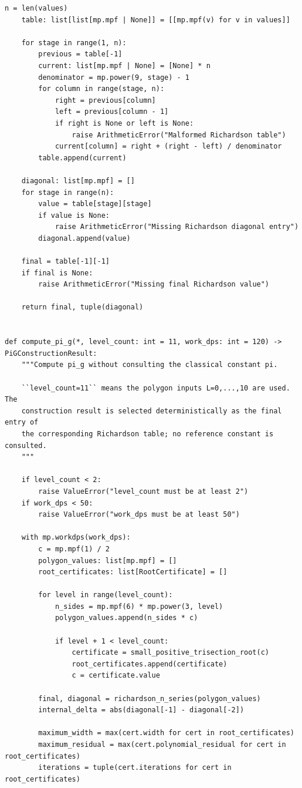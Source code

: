 \documentclass[11pt]{article}
\begin{document}
\begin{lstlisting}[style=pythonstyle,caption={Production lane: \texttt{pi\_g\_construction.py}}]
    n = len(values)
    table: list[list[mp.mpf | None]] = [[mp.mpf(v) for v in values]]

    for stage in range(1, n):
        previous = table[-1]
        current: list[mp.mpf | None] = [None] * n
        denominator = mp.power(9, stage) - 1
        for column in range(stage, n):
            right = previous[column]
            left = previous[column - 1]
            if right is None or left is None:
                raise ArithmeticError("Malformed Richardson table")
            current[column] = right + (right - left) / denominator
        table.append(current)

    diagonal: list[mp.mpf] = []
    for stage in range(n):
        value = table[stage][stage]
        if value is None:
            raise ArithmeticError("Missing Richardson diagonal entry")
        diagonal.append(value)

    final = table[-1][-1]
    if final is None:
        raise ArithmeticError("Missing final Richardson value")

    return final, tuple(diagonal)


def compute_pi_g(*, level_count: int = 11, work_dps: int = 120) -> PiGConstructionResult:
    """Compute pi_g without consulting the classical constant pi.

    ``level_count=11`` means the polygon inputs L=0,...,10 are used.  The
    construction result is selected deterministically as the final entry of
    the corresponding Richardson table; no reference constant is consulted.
    """

    if level_count < 2:
        raise ValueError("level_count must be at least 2")
    if work_dps < 50:
        raise ValueError("work_dps must be at least 50")

    with mp.workdps(work_dps):
        c = mp.mpf(1) / 2
        polygon_values: list[mp.mpf] = []
        root_certificates: list[RootCertificate] = []

        for level in range(level_count):
            n_sides = mp.mpf(6) * mp.power(3, level)
            polygon_values.append(n_sides * c)

            if level + 1 < level_count:
                certificate = small_positive_trisection_root(c)
                root_certificates.append(certificate)
                c = certificate.value

        final, diagonal = richardson_n_series(polygon_values)
        internal_delta = abs(diagonal[-1] - diagonal[-2])

        maximum_width = max(cert.width for cert in root_certificates)
        maximum_residual = max(cert.polynomial_residual for cert in root_certificates)
        iterations = tuple(cert.iterations for cert in root_certificates)


\end{lstlisting}
\end{document}
